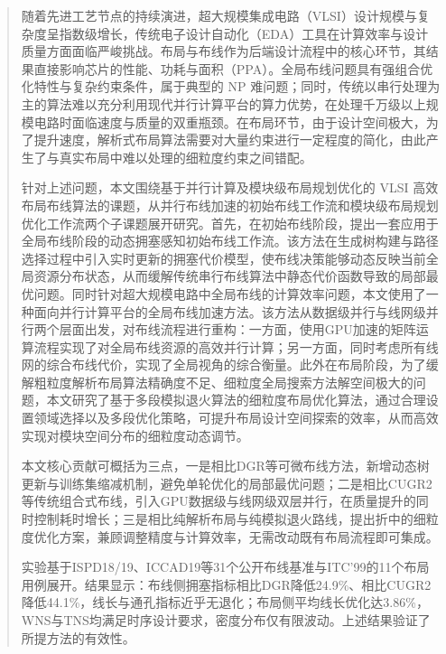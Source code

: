 

\begin{abstract}
  随着先进工艺节点的持续演进，超大规模集成电路（VLSI）设计规模与复杂度呈指数级增长，传统电子设计自动化（EDA）工具在计算效率与设计质量方面面临严峻挑战。布局与布线作为后端设计流程中的核心环节，其结果直接影响芯片的性能、功耗与面积（PPA）。全局布线问题具有强组合优化特性与复杂约束条件，属于典型的 NP 难问题；同时，传统以串行处理为主的算法难以充分利用现代并行计算平台的算力优势，在处理千万级以上规模电路时面临速度与质量的双重瓶颈。在布局环节，由于设计空间极大，为了提升速度，解析式布局算法需要对大量约束进行一定程度的简化，由此产生了与真实布局中难以处理的细粒度约束之间错配。

  针对上述问题，本文围绕基于并行计算及模块级布局规划优化的 VLSI 高效布局布线算法的课题，从并行布线加速的初始布线工作流和模块级布局规划优化工作流两个子课题展开研究。首先，在初始布线阶段，提出一套应用于全局布线阶段的动态拥塞感知初始布线工作流。该方法在生成树构建与路径选择过程中引入实时更新的拥塞代价模型，使布线决策能够动态反映当前全局资源分布状态，从而缓解传统串行布线算法中静态代价函数导致的局部最优问题。同时针对超大规模电路中全局布线的计算效率问题，本文使用了一种面向并行计算平台的全局布线加速方法。该方法从数据级并行与线网级并行两个层面出发，对布线流程进行重构：一方面，使用GPU加速的矩阵运算流程实现了对全局布线资源的高效并行计算；另一方面，同时考虑所有线网的综合布线代价，实现了全局视角的综合衡量。此外在布局阶段，为了缓解粗粒度解析布局算法精确度不足、细粒度全局搜索方法解空间极大的问题，本文研究了基于多段模拟退火算法的细粒度布局优化算法，通过合理设置领域选择以及多段优化策略，可提升布局设计空间探索的效率，从而高效实现对模块空间分布的细粒度动态调节。

  本文核心贡献可概括为三点，一是相比DGR等可微布线方法，新增动态树更新与训练集缩减机制，避免单轮优化的局部最优问题；二是相比CUGR2等传统组合式布线，引入GPU数据级与线网级双层并行，在质量提升的同时控制耗时增长；三是相比纯解析布局与纯模拟退火路线，提出折中的细粒度优化方案，兼顾调整精度与计算效率，无需改动既有布局流程即可集成。

  实验基于ISPD18/19、ICCAD19等31个公开布线基准与ITC'99的11个布局用例展开。结果显示：布线侧拥塞指标相比DGR降低24.9\%、相比CUGR2降低44.1\%，线长与通孔指标近乎无退化；布局侧平均线长优化达3.86\%，WNS与TNS均满足时序设计要求，密度分布仅有限波动。上述结果验证了所提方法的有效性。

\end{abstract}

